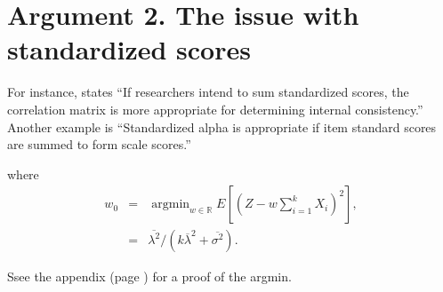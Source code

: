 \documentclass{article}
\theoremstyle{plain}
\theoremstyle{plain}
\theoremstyle{definition}
\theoremstyle{remark}
\theoremstyle{definition}
\theoremstyle{plain}
\theoremstyle{plain}
\theoremstyle{definition}
\DeclareMathOperator{\argmin}{argmin}
\begin{document}
\section{Argument 2. The issue with standardized scores}
For instance, \citet[][p.451]{Falk2011-ae} states \enquote{If researchers intend to sum
standardized scores, the correlation matrix is more appropriate for determining internal consistency.} Another example is \citet[][p.99]{Cortina1993-aq} \enquote{Standardized alpha is appropriate if item standard scores are summed to form scale scores.}

where
\begin{eqnarray}
w_{0} & = & \argmin_{w\in\mathbb{R}}E\left[\left(Z-w\sum_{i=1}^{k}X_{i}\right)^{2}\right], \\
 & = & \overline{\lambda^{2}}/\left(k\overline{\lambda}^{2}+\overline{\sigma^{2}}\right).\label{eq:w0}
\end{eqnarray}

Ssee the appendix (page \pageref{proof:w0}) for a proof of the argmin.
\end{document}

